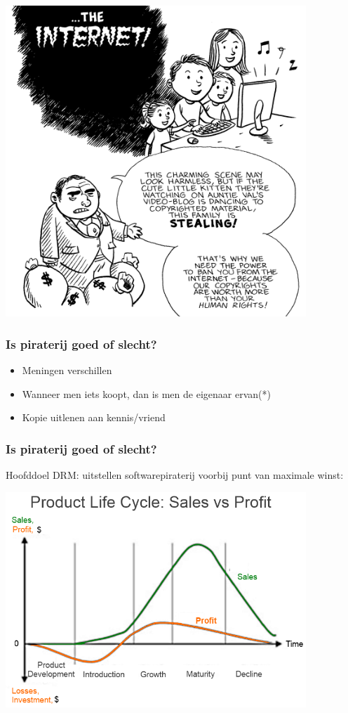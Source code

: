 \documentclass{beamer}
\begin{document}
\begin{frame}

	\begin{center}
	\includegraphics[width=0.85\textwidth]{internet.png}
	\end{center}
\end{frame}

\begin{frame}
	\frametitle{Is piraterij goed of slecht?}

	\begin{itemize}
		\item Meningen verschillen
		\item Wanneer men iets koopt, dan is men de eigenaar ervan(*)
		\item Kopie uitlenen aan kennis/vriend
	\end{itemize}
\end{frame}

\begin{frame}
	\frametitle{Is piraterij goed of slecht?}

	Hoofddoel DRM: uitstellen softwarepiraterij voorbij punt van maximale winst:

	\begin{center}
	\includegraphics[width=0.85\textwidth]{product_lifecycle.png}
	\end{center}
\end{frame}
\end{document}
